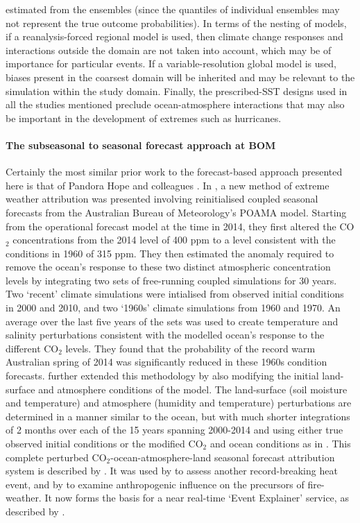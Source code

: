 estimated from the ensembles (since the quantiles of individual ensembles may not represent the true outcome probabilities). In terms of the nesting of models, if a reanalysis-forced regional model is used, then climate change responses and interactions outside the domain are not taken into account, which may be of importance for particular events. If a variable-resolution global model is used, biases present in the coarsest domain will be inherited and may be relevant to the simulation within the study domain. Finally, the prescribed-SST designs used in all the studies mentioned preclude ocean-atmosphere interactions that may also be important in the development of extremes such as hurricanes.

  \paragraph*{The subseasonal to seasonal forecast approach at BOM}

    Certainly the most similar prior work to the forecast-based approach presented here is that of Pandora Hope and colleagues \citep{hope_contributors_2015,hope_what_2016,hope_determining_2019,hope_subseasonal_2022,wang_initialized_2021}. In \citet{hope_contributors_2015}, a new method of extreme weather attribution was presented involving reinitialised coupled seasonal forecasts from the Australian Bureau of Meteorology's POAMA model. Starting from the operational forecast model at the time in 2014, they first altered the CO$_2$ concentrations from the 2014 level of 400 ppm to a level consistent with the conditions in 1960 of 315 ppm. They then estimated the anomaly required to remove the ocean's response to these two distinct atmospheric concentration levels by integrating two sets of free-running coupled simulations for 30 years. Two `recent' climate simulations were intialised from observed initial conditions in 2000 and 2010, and two `1960s' climate simulations from 1960 and 1970. An average over the last five years of the sets was used to create temperature and salinity perturbations consistent with the modelled ocean's response to the different CO$_2$ levels. They found that the probability of the record warm Australian spring of 2014 was significantly reduced in these 1960s condition forecasts. \citet{hope_what_2016} further extended this methodology by also modifying the initial land-surface and atmosphere conditions of the model. The land-surface (soil moisture and temperature) and atmosphere (humidity and temperature) perturbations are determined in a manner similar to the ocean, but with much shorter integrations of 2 months over each of the 15 years spanning 2000-2014 and using either true observed initial conditions or the modified CO$_2$ and ocean conditions as in \citet{hope_contributors_2015}. This complete perturbed CO$_2$-ocean-atmosphere-land seasonal forecast attribution system is described by \citet{wang_initialized_2021}. It was used by \citet{hope_what_2016} to assess another record-breaking heat event, and by \citet{hope_determining_2019} to examine anthropogenic influence on the precursors of fire-weather. It now forms the basis for a near real-time `Event Explainer' service, as described by \citet{hope_subseasonal_2022}.

